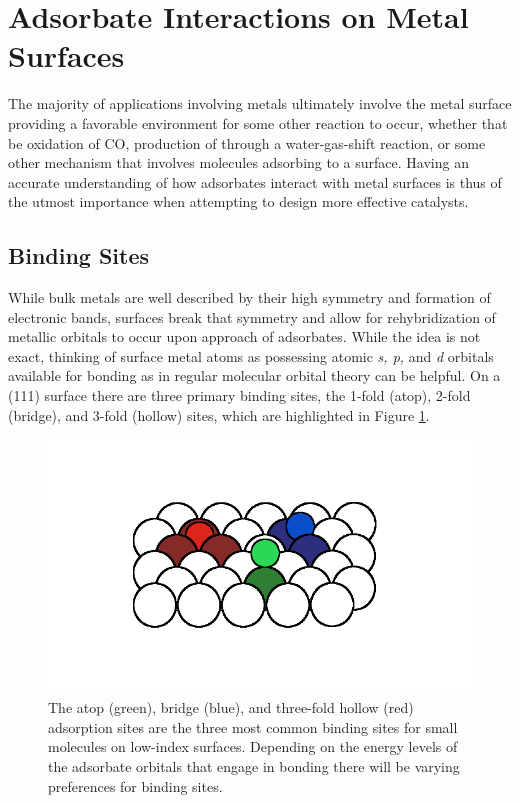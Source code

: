 \section{Adsorbate Interactions on Metal Surfaces}
The majority of applications involving metals ultimately involve the metal
surface providing a favorable environment for some other reaction to occur,
whether that be oxidation of CO, production of  through a
water-gas-shift reaction, or some other mechanism that involves molecules
adsorbing to a surface. Having an accurate understanding of how adsorbates
interact with metal surfaces is thus of the utmost importance when attempting
to design more effective catalysts.

\subsection{Binding Sites}
While bulk metals are well described by their  high symmetry and formation of
electronic bands, surfaces break that symmetry and allow for rehybridization of
metallic orbitals to occur upon approach of adsorbates. While the idea is not
exact, thinking of surface metal atoms as possessing atomic {\em s, p, } and {\em d}
orbitals available for bonding as in regular molecular orbital theory can be
helpful. On a (111) surface there are three primary binding sites, the 1-fold
(atop), 2-fold (bridge), and 3-fold (hollow) sites, which are highlighted in
Figure \ref{fig:binding}. 

\begin{figure}[p!]
  \includegraphics[width=\linewidth]{../figures/chap1/binding.pdf}
  \caption{The atop (green), bridge (blue), and three-fold hollow (red)
adsorption sites are the three most common binding sites for small molecules on
low-index surfaces. Depending on the energy levels of the adsorbate orbitals
that engage in bonding there will be varying preferences for binding sites.}
\label{fig:binding}
\end{figure}

